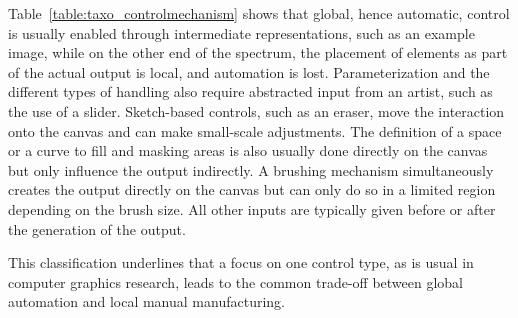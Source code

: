 
Table~\ref{table:taxo_controlmechanism} shows that global, hence automatic, control is usually enabled through intermediate representations, such as an example image, while on the other end of the spectrum, the placement of elements as part of the actual output is local, and automation is lost. Parameterization and the different types of handling also require abstracted input from an artist, such as the use of a slider. Sketch-based controls, such as an eraser, move the interaction onto the canvas and can make small-scale adjustments. The definition of a space or a curve to fill and masking areas is also usually done directly on the canvas but only influence the output indirectly. A brushing mechanism simultaneously creates the output directly on the canvas but can only do so in a limited region depending on the brush size. All other inputs are typically given before or after the generation of the output.

This classification underlines that a focus on one control type, as is usual in computer graphics research, leads to the common trade-off between global automation and local manual manufacturing.

